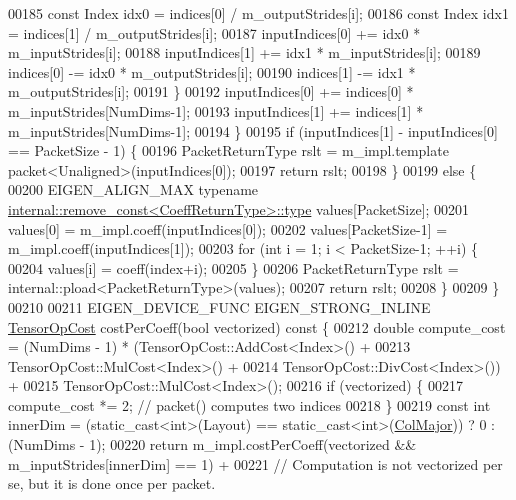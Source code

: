 \begin{DoxyCode}
00185         \textcolor{keyword}{const} Index idx0 = indices[0] / m\_outputStrides[i];
00186         \textcolor{keyword}{const} Index idx1 = indices[1] / m\_outputStrides[i];
00187         inputIndices[0] += idx0 * m\_inputStrides[i];
00188         inputIndices[1] += idx1 * m\_inputStrides[i];
00189         indices[0] -= idx0 * m\_outputStrides[i];
00190         indices[1] -= idx1 * m\_outputStrides[i];
00191       \}
00192       inputIndices[0] += indices[0] * m\_inputStrides[NumDims-1];
00193       inputIndices[1] += indices[1] * m\_inputStrides[NumDims-1];
00194     \}
00195     \textcolor{keywordflow}{if} (inputIndices[1] - inputIndices[0] == PacketSize - 1) \{
00196       PacketReturnType rslt = m\_impl.template packet<Unaligned>(inputIndices[0]);
00197       \textcolor{keywordflow}{return} rslt;
00198     \}
00199     \textcolor{keywordflow}{else} \{
00200       EIGEN\_ALIGN\_MAX \textcolor{keyword}{typename} \hyperlink{group___sparse_core___module}{internal::remove\_const<CoeffReturnType>::type}
       values[PacketSize];
00201       values[0] = m\_impl.coeff(inputIndices[0]);
00202       values[PacketSize-1] = m\_impl.coeff(inputIndices[1]);
00203       \textcolor{keywordflow}{for} (\textcolor{keywordtype}{int} i = 1; i < PacketSize-1; ++i) \{
00204         values[i] = coeff(index+i);
00205       \}
00206       PacketReturnType rslt = internal::pload<PacketReturnType>(values);
00207       \textcolor{keywordflow}{return} rslt;
00208     \}
00209   \}
00210 
00211   EIGEN\_DEVICE\_FUNC EIGEN\_STRONG\_INLINE \hyperlink{class_eigen_1_1_tensor_op_cost}{TensorOpCost} costPerCoeff(\textcolor{keywordtype}{bool} vectorized)\textcolor{keyword}{ const }\{
00212     \textcolor{keywordtype}{double} compute\_cost = (NumDims - 1) * (TensorOpCost::AddCost<Index>() +
00213                                            TensorOpCost::MulCost<Index>() +
00214                                            TensorOpCost::DivCost<Index>()) +
00215         TensorOpCost::MulCost<Index>();
00216     \textcolor{keywordflow}{if} (vectorized) \{
00217       compute\_cost *= 2;  \textcolor{comment}{// packet() computes two indices}
00218     \}
00219     \textcolor{keyword}{const} \textcolor{keywordtype}{int} innerDim = (\textcolor{keyword}{static\_cast<}\textcolor{keywordtype}{int}\textcolor{keyword}{>}(Layout) == static\_cast<int>(\hyperlink{group__enums_ggaacded1a18ae58b0f554751f6cdf9eb13a0cbd4bdd0abcfc0224c5fcb5e4f6669a}{ColMajor})) ? 0 : (NumDims - 
      1);
00220     \textcolor{keywordflow}{return} m\_impl.costPerCoeff(vectorized && m\_inputStrides[innerDim] == 1) +
00221         \textcolor{comment}{// Computation is not vectorized per se, but it is done once per packet.}

\end{DoxyCode}
